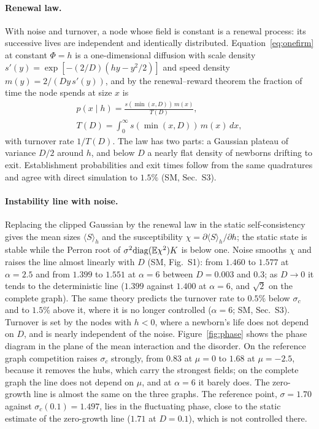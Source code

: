 \documentclass[pre,twocolumn,superscriptaddress,nofootinbib]{revtex4-2}
\newcommand{\E}{\mathbb E}
\begin{document}
\paragraph{Renewal law.}  With noise and turnover, a node whose field is constant is a renewal
process: its successive lives are independent and identically distributed.  Equation~\eqref{eq:onefirm}
at constant $\Phi=h$ is a one-dimensional diffusion with scale density
$s'(y)=\exp[-(2/D)(hy-y^2/2)]$ and speed density $m(y)=2/(Dy\,s'(y))$, and by the renewal--reward theorem
the fraction of time the node spends at size $x$ is
\begin{gather}
p(x\mid h)=\frac{s(\min(x,D))\,m(x)}{T(D)},\nonumber\\
T(D)=\int_0^\infty s(\min(x,D))\,m(x)\,dx,
\label{eq:renewal}
\end{gather}
with turnover rate $1/T(D)$.  The law has two parts: a Gaussian plateau of variance $D/2$ around $h$,
and below $D$ a nearly flat density of newborns drifting to exit.  Establishment probabilities and
exit times follow from the same quadratures and agree with direct simulation to $1.5\%$ (SM,
Sec.~S3).

\paragraph{Instability line with noise.}  Replacing the clipped Gaussian by the renewal law in the
static self-consistency gives the mean sizes $\langle S\rangle_h$ and the susceptibility
$\chi=\partial\langle S\rangle_h/\partial h$; the static state is stable while the Perron root of
$\sigma^2{\rm diag}(\E\chi^2)K$ is below one.  Noise smooths $\chi$ and raises the line almost linearly with
$D$ (SM, Fig.~S1): from $1.460$ to $1.577$ at $\alpha=2.5$ and from $1.399$ to $1.551$ at
$\alpha=6$ between $D=0.003$ and $0.3$; as $D\to0$ it tends to the deterministic line ($1.399$ against
$1.400$ at $\alpha=6$, and $\sqrt2$ on the complete graph).  The same theory predicts the turnover rate
to $0.5\%$ below $\sigma_c$ and to $1.5\%$ above it, where it is no longer controlled ($\alpha=6$; SM,
Sec.~S3).  Turnover is set by
the nodes with $h<0$, where a newborn's life does not depend on $D$, and is nearly independent of the
noise.  Figure~\ref{fig:phase} shows the phase diagram in the plane of the mean interaction and the
disorder.  On the reference graph competition raises $\sigma_c$ strongly, from $0.83$ at $\mu=0$ to $1.68$ at
$\mu=-2.5$, because it removes the hubs, which carry the strongest fields; on the complete graph the
line does not depend on $\mu$, and at $\alpha=6$ it barely does.  The zero-growth line is almost the same
on the three graphs.  The reference point, $\sigma=1.70$ against $\sigma_c(0.1)=1.497$, lies in the fluctuating phase, close to
the static estimate of the zero-growth line ($1.71$ at $D=0.1$), which is not controlled there.
\end{document}

